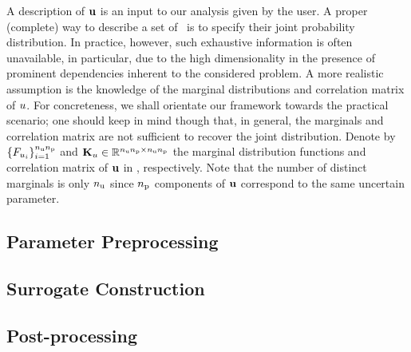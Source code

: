 A description of $\mathbf{u}$ is an input to our analysis given by the user.
A proper (complete) way to describe a set of \rvs\ is to specify their joint probability distribution.
In practice, however, such exhaustive information is often unavailable, in particular, due to the high dimensionality in the presence of prominent dependencies inherent to the considered problem.
A more realistic assumption is the knowledge of the marginal distributions and correlation matrix of $u$.
For concreteness, we shall orientate our framework towards the practical scenario; one should keep in mind though that, in general, the marginals and correlation matrix are not sufficient to recover the joint distribution.
Denote by $\{ F_{u_i} \}_{i = 1}^{{n_\text{u}} {n_\text{p}}}$ and $\mathbf{K}_u \in \mathbb{R}^{{n_\text{u}} {n_\text{p}} \times {n_\text{u}} {n_\text{p}}}$ the marginal distribution functions and correlation matrix of $\mathbf{u}$ in , respectively.
Note that the number of distinct marginals is only ${n_\text{u}}$ since ${n_\text{p}}$ components of $\mathbf{u}$ correspond to the same uncertain parameter.

\subsection{Parameter Preprocessing} 


\subsection{Surrogate Construction}


\subsection{Post-processing} 

